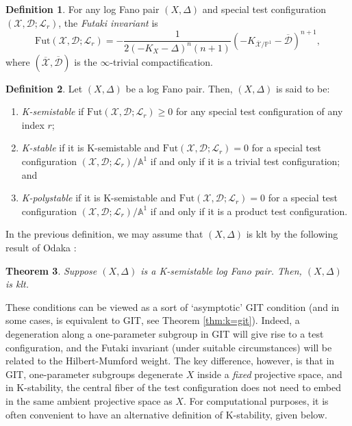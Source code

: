 \documentclass[11pt]{amsart}
\numberwithin{equation}{section}
\newtheorem{theorem}{Theorem}[section]
\theoremstyle{definition}
\newtheorem{definition}[theorem]{Definition}
\newcommand{\calL}{\mathcal{L}}
\newcommand{\calX}{\mathcal{X}}
\newcommand{\bP}{\mathbb{P}}
\newcommand{\bA}{\mathbb{A}}
\newcommand{\cX}{\mathcal X}
\newcommand{\cL}{\mathcal L}
\newcommand{\Fut}{\mathrm{Fut}}
\begin{document}
\begin{definition}
    For any log Fano pair $(X,\Delta)$ and special test configuration $(\calX, \mathcal{D}; \calL_r)$, the \textit{Futaki invariant} is 
    \[ \Fut(\calX, \mathcal{D}; \calL_r) = - \frac{1}{2(-K_X-\Delta)^n(n+1)} \left(-K_{\overline{\calX}/\bP^1} - \overline{\mathcal{D}}\right)^{n+1} ,\]
    where $(\overline{\calX},\overline{\mathcal{D}})$ is the $\infty$-trivial compactification.
\end{definition}

\begin{definition}
     Let $(X,\Delta)$ be a log Fano pair.  Then, $(X,\Delta)$ is said to be:
\begin{enumerate}[label=(\roman*)]
    \item \emph{K-semistable} if $\Fut(\cX,\mathcal{D};\cL_r)\geq 0$ for any special test configuration of any index $r$;
    
    \item  \emph{K-stable} if it is K-semistable and $\Fut(\cX,\mathcal{D};\cL_r)=0$ for a special test configuration $(\cX,\mathcal{D};\cL_r)/\bA^1$ if and only if it is a trivial test configuration; and
 
\item \emph{K-polystable} if it is K-semistable and $\Fut(\cX,\mathcal{D};\cL_r)=0$ for a special test configuration $(\cX,\mathcal{D};\cL_r)/\bA^1$ if and only if it is a product test configuration.
\end{enumerate}
\end{definition}

In the previous definition, we may assume that $(X, \Delta)$ is klt by the following result of Odaka \cite{Odaka13}: 

\begin{theorem}\label{thm:kssisklt}
    Suppose $(X, \Delta)$ is a K-semistable log Fano pair.  Then, $(X, \Delta)$ is klt. 
\end{theorem}

These conditions can be viewed as a sort of `asymptotic' GIT condition (and in some cases, is equivalent to GIT, see Theorem \ref{thm:k=git}). Indeed, a degeneration along a one-parameter subgroup in GIT will give rise to a test configuration, and the Futaki invariant (under suitable circumstances) will be related to the Hilbert-Mumford weight.  The key difference, however, is that in GIT, one-parameter subgroups degenerate $X$ inside a \textit{fixed} projective space, and in K-stability, the central fiber of the test configuration does not need to embed in the same ambient projective space as $X$.  For computational purposes, it is often convenient to have an alternative definition of K-stability, given below. 
\end{document}
